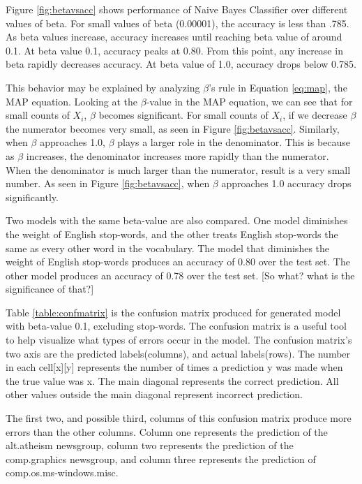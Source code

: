 \documentclass{IEEEtran}
\begin{document}
Figure \ref{fig:betavsacc} shows performance of Naive Bayes Classifier over different values of beta. For small values of beta (0.00001), the accuracy is less than .785. As beta values increase, accuracy increases until reaching beta value of around 0.1. At beta value 0.1, accuracy peaks at 0.80. From this point, any increase in beta rapidly decreases accuracy. At beta value of 1.0, accuracy drops below 0.785.

This behavior may be explained by analyzing $\beta$'s rule in Equation \ref{eq:map}, the MAP equation. Looking at the $\beta$-value in the MAP equation, we can see that for small counts of $X_i$, $\beta$ becomes significant. For small counts of $X_i$, if we decrease $\beta$ the numerator becomes very small, as seen in Figure \ref{fig:betavsacc}. Similarly, when $\beta$ approaches 1.0, $\beta$ plays a larger role in the denominator. This is because as $\beta$ increases, the denominator increases more rapidly than the numerator. When the denominator is much larger than the numerator, result is a very small number. As seen in Figure \ref{fig:betavsacc}, when $\beta$ approaches 1.0 accuracy drops significantly.

Two models with the same beta-value are also compared. One model diminishes the weight of English stop-words, and the other treats English stop-words the same as every other word in the vocabulary. The model that diminishes the weight of English stop-words produces an accuracy of 0.80 over the test set. The other model produces an accuracy of 0.78 over the test set. [So what? what is the significance of that?]

Table \ref{table:confmatrix} is the confusion matrix produced for generated model with beta-value 0.1, excluding stop-words. The confusion matrix is a useful tool to help visualize what types of errors occur in the model. The confusion matrix's two axis are the predicted labels(columns), and actual labels(rows). The number in each cell[x][y] represents the number of times a prediction y was made when the true value was x. The main diagonal represents the correct prediction. All other values outside the main diagonal represent incorrect prediction.

The first two, and possible third, columns of this confusion matrix produce more errors than the other columns. Column one represents the prediction of the alt.atheism newsgroup, column two represents the prediction of the comp.graphics newsgroup, and column three represents the prediction of comp.os.ms-windows.misc.
\end{document}
